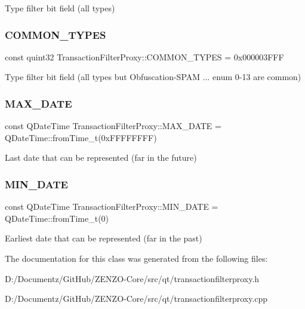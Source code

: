 Type filter bit field (all types) \mbox{\label{class_transaction_filter_proxy_a2aa26410f537c1c81acbe477ab9b7b0d}} 
\subsubsection{\texorpdfstring{COMMON\_TYPES}{COMMON\_TYPES}}
{\footnotesize\ttfamily const quint32 Transaction\+Filter\+Proxy\+::\+C\+O\+M\+M\+O\+N\+\_\+\+T\+Y\+P\+ES = 0x000003\+F\+FF\hspace{0.3cm}{\ttfamily [static]}}

Type filter bit field (all types but Obfuscation-\/\+S\+P\+AM ... enum 0-\/13 are common) \mbox{\label{class_transaction_filter_proxy_a5ac7f4d41a56e44f4cc74ebeffb5a254}} 
\subsubsection{\texorpdfstring{MAX\_DATE}{MAX\_DATE}}
{\footnotesize\ttfamily const Q\+Date\+Time Transaction\+Filter\+Proxy\+::\+M\+A\+X\+\_\+\+D\+A\+TE = Q\+Date\+Time\+::from\+Time\+\_\+t(0x\+F\+F\+F\+F\+F\+F\+F\+F)\hspace{0.3cm}{\ttfamily [static]}}

Last date that can be represented (far in the future) \mbox{\label{class_transaction_filter_proxy_aac7bf4c1105641b19eb6f7c8741b502e}} 
\subsubsection{\texorpdfstring{MIN\_DATE}{MIN\_DATE}}
{\footnotesize\ttfamily const Q\+Date\+Time Transaction\+Filter\+Proxy\+::\+M\+I\+N\+\_\+\+D\+A\+TE = Q\+Date\+Time\+::from\+Time\+\_\+t(0)\hspace{0.3cm}{\ttfamily [static]}}

Earliest date that can be represented (far in the past) 

The documentation for this class was generated from the following files\+:\begin{DoxyCompactItemize}
\item 
D\+:/\+Documentz/\+Git\+Hub/\+Z\+E\+N\+Z\+O-\/\+Core/src/qt/transactionfilterproxy.\+h\item 
D\+:/\+Documentz/\+Git\+Hub/\+Z\+E\+N\+Z\+O-\/\+Core/src/qt/transactionfilterproxy.\+cpp\end{DoxyCompactItemize}
